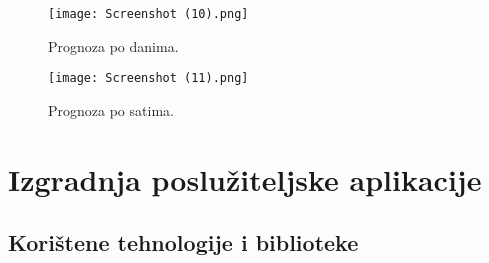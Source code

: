 \documentclass[times, utf8, zavrsni]{fer}
\begin{document}
\begin{figure}[h]
\centering
\texttt{[image: Screenshot (10).png]}
\caption{Prognoza po danima.}
\end{figure}


\begin{figure}[h]
\centering
\texttt{[image: Screenshot (11).png]}
\caption{Prognoza po satima.}
\end{figure}

\section{Izgradnja poslužiteljske aplikacije}

\subsection{Korištene tehnologije i biblioteke}
\end{document}
